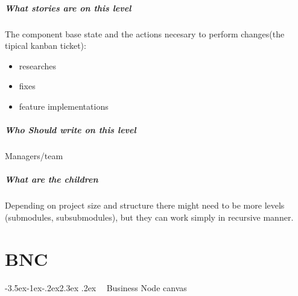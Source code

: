 \documentclass[12pt,a4paper,twoside]{article}
\makeatletter
\def\section{\@startsection{section}{1}{\z@ }%
  {-3.5ex\@plus -1ex\@minus -.2ex}{2.3ex \@plus .2ex}%
  {\noindent\normalfont \Large \bfseries \ }%
}
\makeatother
\begin{document}
\subsubsection{What stories are on this level}
The component base state and the actions necesary to perform changes(the tipical kanban ticket):
\begin{itemize}
    \item researches
    \item fixes
    \item feature implementations
\end{itemize} 
\subsubsection{Who Should write on this level}
Managers/team
\subsubsection{What are the children}
Depending on project size and structure there might need to be more levels (submodules, subsubmodules), but they can work simply in recursive manner.



\newpage
\part{BNC}
\section{Business Node canvas}


\newcommand{\tabwidth}{3cm}


\newcommand{\headit}[1] {
\color{blue}\textbf{\nameref{#1}} \Repeat{7}{ \\ \rinc{#1}} \setcounter{subc}{0}}
\end{document}
